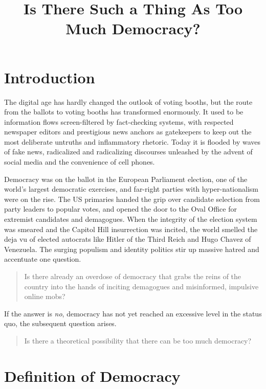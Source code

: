 \documentclass{scrartcl}
\theoremstyle{definition}
\begin{document}
\title{Is There Such a Thing As Too Much Democracy?}
\author{}
\date{}
\maketitle

\section{Introduction}

The digital age has hardly changed the outlook of voting booths, but the route from the ballots to voting booths has transformed enormously. It used to be information flows screen-filtered by fact-checking systems, with respected newspaper editors and prestigious news anchors as gatekeepers to keep out the most deliberate untruths and inflammatory rhetoric. Today it is flooded by waves of fake news, radicalized and radicalizing discourses unleashed by the advent of social media and the convenience of cell phones. 

Democracy was on the ballot in the European Parliament election, one of the world’s largest democratic exercises, and far-right parties with hyper-nationalism were on the rise. The US primaries handed the grip over candidate selection from party leaders to popular votes, and opened the door to the Oval Office for extremist candidates and demagogues. When the integrity of the election system was smeared and the Capitol Hill insurrection was incited, the world smelled the deja vu of elected autocrats like Hitler of the Third Reich and Hugo Chavez of Venezuela. The surging populism and identity politics stir up massive hatred and accentuate one question. 

\begin{quote}
Is there already an overdose of democracy that grabs the reins of the country into the hands of inciting demagogues and misinformed, impulsive online mobs? 
\end{quote}

If the answer is \emph{no}, democracy has not yet reached an excessive level in the status quo, the subsequent question arises.

\begin{quote}
Is there a theoretical possibility that there can be too much democracy? 
\end{quote}

\section{Definition of Democracy}
\end{document}
